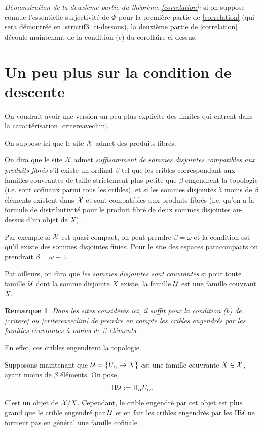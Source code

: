 \documentclass[12pt]{article}
\newcommand{\numero}[1]{\newpage\section{#1}}
\newtheorem{remarque}[lemma]{Remarque}
\newcommand{\Uu}{{\cal U}}
\newcommand{\Xx}{{\cal X}}
\begin{document}
{\em D\'emonstration de la deuxi\`eme partie du th\'eor\`eme
\ref{correlation}:} si on suppose connue l'es\-sen\-ti\-el\-le surjectivit\'e de
$\Phi$ pour la premi\`ere partie de \ref{correlation} (qui sera d\'emontr\'ee en
\ref{strictif3} ci-dessous), la deuxi\`eme partie de \ref{correlation}
d\'ecoule maintenant de la condition (c) du corollaire ci-dessus.

\bigskip


\numero{Un peu plus sur la condition de descente}

\label{peupluspage}

On voudrait avoir une version un peu plus explicite des limites qui entrent
dans la caract\'erisation \ref{critereaveclim}.

On suppose ici que le site $\Xx$ admet des produits fibr\'es.


On dira que le site $\Xx$ admet {\em suffisamment de sommes disjointes
compatibles aux produits fibr\'es}
s'il existe un ordinal $\beta$ tel que les cribles correspondant aux familles
couvrantes de taille strictement plus petite que
$\beta$ engendrent la topologie (i.e. sont cofinaux
parmi tous les cribles), et si les sommes disjointes \`a
moins de $\beta$ \'el\'ements
existent dans $\Xx$ et sont compatibles aux produits fibr\'es (i.e. qu'on a la
formule de distributivit\'e pour le produit fibr\'e de deux sommes disjointes
au-dessus d'un objet de $X$).

Par exemple si $\Xx$ est quasi-compact, on peut prendre
$\beta = \omega$ et la condition est qu'il existe des sommes disjointes finies.
Pour le site des espaces paracompacts on prendrait $\beta = \omega +1$.

Par ailleurs, on dira que {\em les sommes disjointes sont couvrantes} si
pour toute famille $\Uu$ dont la somme disjointe $X$ existe, la famille $\Uu$
est une famille couvrant $X$.




\begin{remarque}
\label{casuffit}
Dans les sites consid\'er\'es ici,
il suffit pour la condition (b) de \ref{critere} ou \ref{critereaveclim}
de prendre en compte les cribles engendr\'es par les familles couvrantes \`a
moins de $\beta$ \'el\'ements.
\end{remarque}
En effet, ces cribles engendrent la topologie.



Supposons maintenant que $\Uu = \{ U_{\alpha}\rightarrow X\}$ est une famille
couvrante $X\in \Xx$, ayant moins de $\beta$ \'el\'ements. On pose
$$
\amalg \Uu :=
\amalg _{\alpha} U_{\alpha}.
$$
C'est un objet de $\Xx /X$. Cependant, le crible engendr\'e par cet objet
est plus grand que le crible engendr\'e par $\Uu$ et en fait les cribles
engendr\'es par les $\amalg \Uu$ ne forment pas en g\'en\'eral
une famille cofinale.
\end{document}
